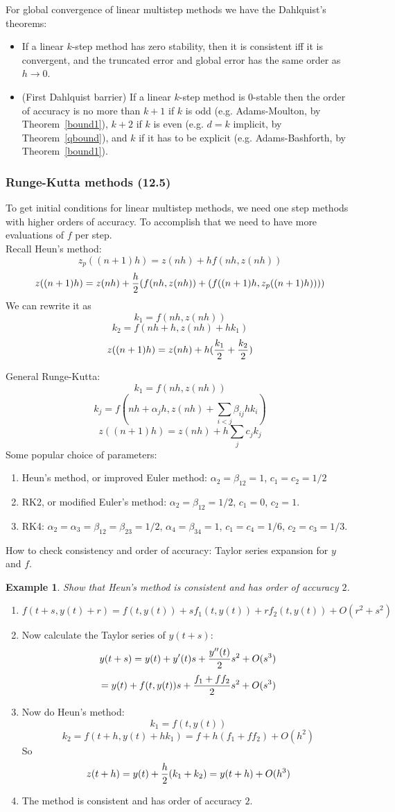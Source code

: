 \documentclass{article} %
\theoremstyle{break}
\newtheorem{exa}[definition]{Example}
\begin{document}
For global convergence of linear multistep methods we have the Dahlquist's theorems:
\begin{itemize}
\item If a linear $k$-step method has zero stability, then it is consistent iff it is convergent, and the truncated error and global error has the same order as $h\rightarrow 0$.
\item (First Dahlquist barrier) If a linear $k$-step method is 0-stable then the order of accuracy is no more than $k+1$ if $k$ is odd (e.g. Adams-Moulton, by Theorem~\ref{bound1}), $k+2$ if $k$ is even (e.g. $d=k$ implicit, by Theorem~\ref{qbound}), and $k$ if it has to be explicit (e.g. Adams-Bashforth, by Theorem~\ref{bound1}).
\end{itemize}


\subsubsection{Runge-Kutta methods (12.5)}

To get initial conditions for linear multistep methods, we need one step methods with higher orders of accuracy. To accomplish that we need to have more evaluations of $f$ per step.\\

Recall Heun's method:
\[z_p((n+1)h)=z(nh)+hf(nh, z(nh))\]
\[z((n+1)h)=z(nh)+{h\over 2}(f(nh, z(nh))+(f((n+1)h, z_p((n+1)h))))\]
We can rewrite it as
\[k_1=f(nh, z(nh))\]
\[k_2=f(nh+h, z(nh)+hk_1)\]
\[z((n+1)h)=z(nh)+h({k_1\over 2}+{k_2\over 2})\]

General Runge-Kutta:
\[k_1=f(nh, z(nh))\]
\[k_j=f(nh+\alpha_jh, z(nh)+\sum_{i<j}\beta_{ij}hk_i)\]
\[z((n+1)h)=z(nh)+h\sum_jc_jk_j\]
Some popular choice of parameters:
\begin{enumerate}
\item Heun's method, or improved Euler method: $\alpha_2=\beta_{12}=1$, $c_1=c_2=1/2$
\item RK2, or modified Euler's method: $\alpha_2=\beta_{12}=1/2$, $c_1=0$, $c_2=1$.
\item RK4: $\alpha_2=\alpha_3=\beta_{12}=\beta_{23}=1/2$, $\alpha_4=\beta_{34}=1$, $c_1=c_4=1/6$, $c_2=c_3=1/3$.   
\end{enumerate}


How to check consistency and order of accuracy: Taylor series expansion for $y$ and $f$.
\begin{exa}Show that Heun's method is consistent and has order of accuracy $2$.\end{exa}
\begin{enumerate}
\item
  \[f(t+s, y(t)+r)=f(t, y(t))+sf_1(t, y(t))+rf_2(t, y(t))+O(r^2+s^2)\]
\item Now calculate the Taylor series of $y(t+s)$:
  \[y(t+s)=y(t)+y'(t)s+{y''(t)\over 2}s^2+O(s^3)\]
  \[=y(t)+f(t, y(t))s+{f_1+ff_2\over 2}s^2+O(s^3)\]
\item Now do Heun's method:
  \[k_1=f(t, y(t))\]
  \[k_2=f(t+h, y(t)+hk_1)=f+h(f_1+ff_2)+O(h^2)\]
  So
  \[z(t+h)=y(t)+{h\over 2}(k_1+k_2)=y(t+h)+O(h^3)\]
\item The method is consistent and has order of accuracy $2$.
\end{enumerate}
\end{document}
